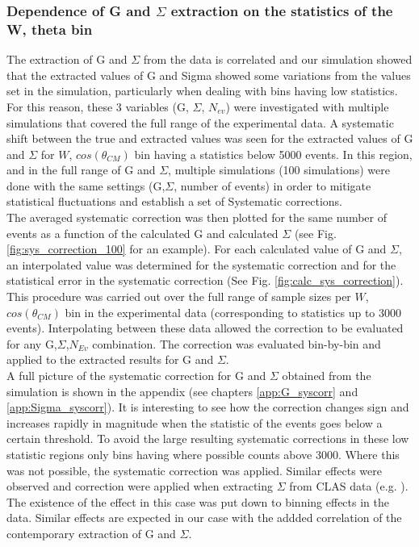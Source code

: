   
\subsubsection{Dependence of G and \texorpdfstring{$\Sigma$}{Sigma} extraction on the  statistics of the W, theta bin}\label{sec:G_Sigma_sys}
The extraction of G and $\Sigma$ from the data is correlated and our simulation showed that the extracted values of G and Sigma showed some variations from the values set in the simulation, particularly when dealing with bins having low statistics.  For this reason, these 3 variables (G, $\Sigma$, $N_{ev}$) were investigated with multiple simulations that covered the full range of the experimental data. A systematic shift between the true and extracted values was seen for the extracted values of G and $\Sigma$ for $W$, $cos(\theta_{CM})$ bin having a statistics below 5000 events. In this region, and in the full range of G and $\Sigma$, multiple simulations (100 simulations) were done with the same settings (G,$\Sigma$, number of events) in order to mitigate statistical fluctuations and establish a set of Systematic corrections.  \\
The averaged systematic correction was then plotted for the same number of events as a function of the calculated G and calculated $\Sigma$ (see Fig. \ref{fig:sys_correction_100} for an example). For each calculated value of G and $\Sigma$, an interpolated value was determined for the systematic correction and for the statistical error in the systematic correction (See Fig. \ref{fig:calc_sys_correction}). 
This procedure was carried out over the full range of sample sizes per $W$, $cos(\theta_{CM})$ bin in the experimental data (corresponding to statistics up to 3000 events). Interpolating between these data allowed the correction to be evaluated for any G,$\Sigma$,$N_{Ev}$ combination. The correction was evaluated bin-by-bin and applied to the extracted results for G and $\Sigma$.  \\
A full picture of the systematic correction for G and $\Sigma$ obtained from the simulation is shown in the appendix (see chapters \ref{app:G_syscorr} and \ref{app:Sigma_syscorr}). It is interesting to see how the correction changes sign and increases rapidly in magnitude when the statistic of the events goes below a certain threshold. To avoid the large resulting systematic corrections in these low statistic regions only bins having where possible counts above 3000. Where this was not possible, the systematic correction was applied. 
Similar effects were observed and correction were applied when extracting $\Sigma$ from CLAS data (e.g. \cite{Zacha_2017}). The existence of the effect in this case was put down to binning effects in the data. Similar effects are expected in our case with the addded correlation of the contemporary extraction of G and $\Sigma$.
